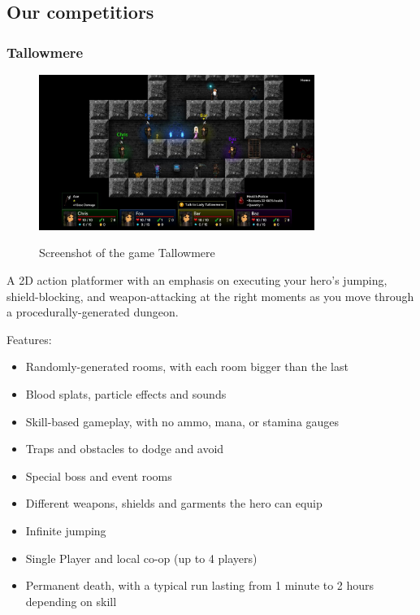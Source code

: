\documentclass[12p]{article}
\begin{document}

\newpage
\subsection{Our competitiors}

\subsubsection[Tallowmere]{Tallowmere \cite{Tallowmere}} \label{sec:StateOfTheArt_Tallowmere}

\begin{figure}[ht]
 \center
 \includegraphics[width=0.8\textwidth]{StateOfTheArtScreenshots/tallowmere.jpeg}
 \label{sec:StateOfTheArt_Screenshots_Tallowmere}
 \caption{Screenshot of the game Tallowmere \cite{Tallowmere}}
\end{figure}

A 2D action platformer with an emphasis on executing your hero's jumping, shield-blocking, and weapon-attacking at the right moments as you move through a procedurally-generated dungeon.

Features:

\begin{itemize}
 \item Randomly-generated rooms, with each room bigger than the last
 \item Blood splats, particle effects and sounds
 \item Skill-based gameplay, with no ammo, mana, or stamina gauges
 \item Traps and obstacles to dodge and avoid
 \item Special boss and event rooms
 \item Different weapons, shields and garments the hero can equip
 \item Infinite jumping
 \item Single Player and local co-op (up to 4 players)
 \item Permanent death, with a typical run lasting from 1 minute to 2 hours depending on skill
\end{itemize}
\end{document}
